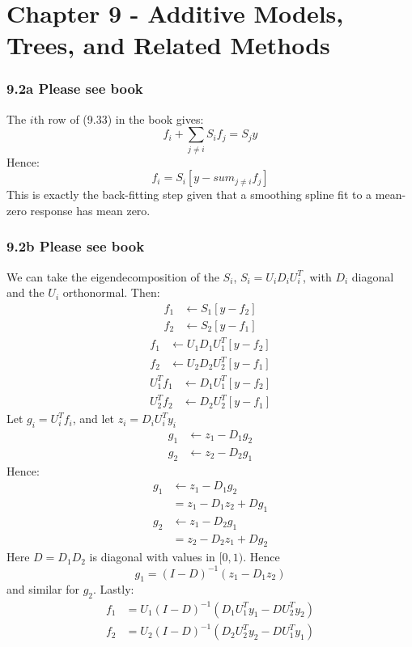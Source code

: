 \chapter{Chapter 9 - Additive Models, Trees, and Related Methods}

\subsection*{9.2a Please see book}

The $i$th row of (9.33) in the book gives:
$$ f_i + \sum_{j \neq i} S_i f_j = S_j y$$
Hence:
$$ f_i = S_i\left[ y - sum_{j \neq i} f_j\right]$$
This is exactly the back-fitting step given that a smoothing spline fit to a mean-zero response has mean zero.

\subsection*{9.2b Please see book}

We can take the eigendecomposition of the $S_i$, $S_i = U_i D_i U_i^T$, with $D_i$ diagonal and the $U_i$ orthonormal.
Then:
\begin{align*}
    f_1 &\leftarrow S_1 \left[y - f_2\right] \\
    f_2 &\leftarrow S_2 \left[y - f_1\right] 
\end{align*}
\begin{align*}
    f_1 &\leftarrow U_1 D_1 U_1^T \left[y - f_2\right] \\
    f_2 &\leftarrow U_2 D_2 U_2^T \left[y - f_1\right]   
\end{align*}
\begin{align*}
    U_1^T f_1 &\leftarrow D_1 U_1^T \left[y - f_2\right] \\
    U_2^T f_2 &\leftarrow D_2 U_2^T \left[y - f_1\right] 
\end{align*}
Let $g_i = U_i^T f_i$, and let $z_i = D_i U_i^T y_i$
\begin{align*}
    g_1 &\leftarrow z_1 - D_1 g_2 \\
    g_2 &\leftarrow z_2 - D_2 g_1
\end{align*}
Hence:
\begin{align*}
    g_1 &\leftarrow z_1 - D_1 g_2 \\
    &= z_1 - D_1 z_2 + D g_1\\
    g_2 &\leftarrow z_1 - D_2 g_1\\
    &= z_2 - D_2 z_1 + D g_2 
\end{align*}
Here $D = D_1 D_2$ is diagonal with values in $[0,1)$. Hence $$g_1 = (I - D)^{-1} (z_1 - D_1 z_2)$$ and similar for $g_2$.
Lastly:
\begin{align*}
    f_1 &= U_1 (I - D)^{-1} (D_1 U_1^T y_1 - D U_2^T y_2)\\
    f_2 &= U_2 (I - D)^{-1} (D_2 U_2^T y_2 - D U_1^T y_1)
\end{align*}

